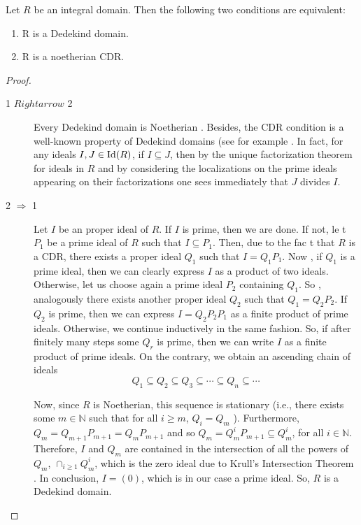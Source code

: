 \begin{theorem}\label{CDRDedekind}
Let $R$ be an integral domain. Then the following two conditions are equivalent:
\begin{enumerate}
\item R is a Dedekind domain.
\item R is a noetherian CDR.
\end{enumerate}
\end{theorem}
\begin{proof}
  \begin{description}
  \item[1 $Rightarrow$ 2]  Every Dedekind domain is Noetherian \cite[Theorem 37.1]{colemanmultidealtheory}. Besides, the CDR condition is a well-known property of Dedekind domains (see for example \cite[Fundamental Theorem of OAK-s]{weissalgebraicnumber}. In fact, for any ideals $I,J \in {\rm Id}(R)$, if $I \subseteq J$, then by the unique factorization theorem for ideals in $R$ \cite[Theorem 37.11]{colemanmultidealtheory} and by considering the localizations on the prime ideals appearing on their factorizations one sees immediately that $J$ divides $I$.
  \item[2 $\Rightarrow$ 1] 
Let $I$ be an proper ideal of $R$. If $I$ is prime, then we are done. If not, le
t $P_1$ be a prime ideal of $R$ such that $I\subseteq P_1$. Then, due to the fac
t that $R$ is a CDR, there exists a proper ideal $Q_1$ such that $I=Q_1P_1$. Now
, if $Q_1$ is a prime ideal, then we can clearly express $I$ as a product of two
 ideals. Otherwise, let us choose again a prime ideal $P_2$ containing $Q_1$. So
, analogously there exists another proper ideal $Q_2$ such that $Q_1=Q_2P_2$. If $Q_2$ is prime, then we can express $I= Q_2P_2P_1$ as a finite product of prime ideals. Otherwise, we continue inductively in the same fashion. So, if after finitely many steps some $Q_r$ is prime, then we can write $I$ as a finite product of prime ideals. On the contrary, we obtain an ascending chain of ideals 
\[Q_1\subseteq Q_2 \subseteq Q_3\subseteq \cdots \subseteq Q_n \subseteq \cdots\]

Now, since $R$ is Noetherian, this sequence is stationary (i.e., there exists some $m\in \mathbb{N}$ such that for all $i\geq m$, $Q_i=Q_m$ \cite[Proposition 6.2]{atimac}). Furthermore, $Q_m=Q_{m+1}P_{m+1}=Q_mP_{m+1}$ and so $Q_m=Q_m^iP_{m+1}\subseteq Q_m^i$, for all $i \in \mathbb{N}$. Therefore, $I$ and $Q_m$ are contained in the intersection of all the powers of $Q_m$, $\cap_{i\geq 1}Q_m^i$, which is the zero ideal due to Krull's Intersection Theorem \cite[Corollary 5.4]{eisenbud}. In conclusion, $I=(0)$, which is in our case a prime ideal. So, $R$ is a Dedekind domain.

  \end{description}
\end{proof}


